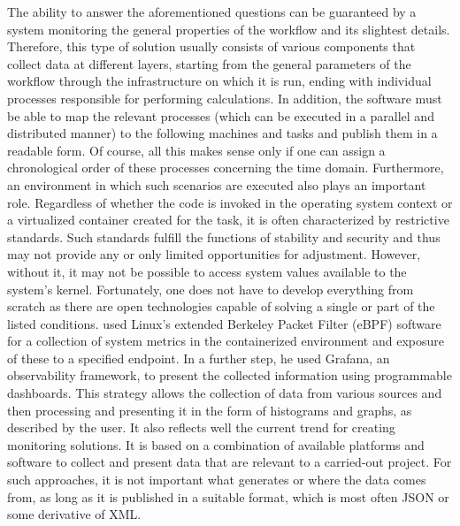 \documentclass[lettersize,journal]{IEEEtran}
\begin{document}
	The ability to answer the aforementioned questions can be guaranteed by a system monitoring the general properties of the workflow and its slightest details. Therefore, this type of solution usually consists of various components that collect data at different layers, starting from the general parameters of the workflow through the infrastructure on which it is run, ending with individual processes responsible for performing calculations. In addition, the software must be able to map the relevant processes (which can be executed in a parallel and distributed manner) to the following machines and tasks and publish them in a readable form. Of course, all this makes sense only if one can assign a chronological order of these processes concerning the time domain. Furthermore, an environment in which such scenarios are executed also plays an important role. Regardless of whether the code is invoked in the operating system context or a virtualized container created for the task, it is often characterized by restrictive standards. Such standards fulfill the functions of stability and security and thus may not provide any or only limited opportunities for adjustment. However, without it, it may not be possible to access system values available to the system's kernel. 
	Fortunately, one does not have to develop everything from scratch as there are open technologies capable of solving a single or part of the listed conditions. \citeauthor{levin2020viperproberethinkingmicroservice} used Linux’s extended Berkeley Packet Filter (eBPF)\cite{ebpf} software for a collection of system metrics in the containerized environment and exposure of these to a specified endpoint. In a further step, he used Grafana\cite{grafana}, an observability framework, to present the collected information using programmable dashboards. This strategy allows the collection of data from various sources and then processing and presenting it in the form of histograms and graphs, as described by the user. It also reflects well the current trend for creating monitoring solutions. It is based on a combination of available platforms and software to collect and present data that are relevant to a carried-out project. For such approaches, it is not important what generates or where the data comes from, as long as it is published in a suitable format, which is most often JSON or some derivative of XML.
	
\end{document}
